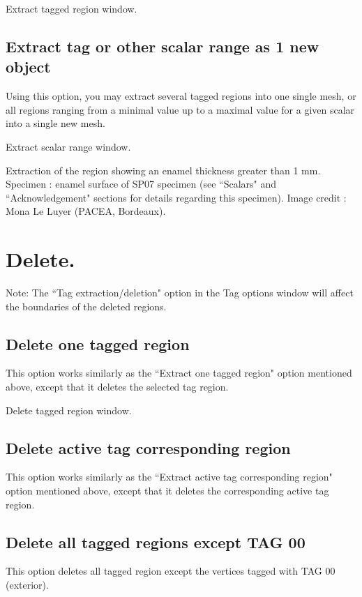 Extract tagged region window.

\subsection{Extract tag or other scalar range as 1 new object}
Using this option, you may extract several tagged regions
into one single mesh, or all regions ranging from a minimal
value up to a maximal value for a given scalar into a single
new mesh.

Extract scalar range window.

Extraction of the region showing an enamel thickness greater than 1 mm. Specimen : enamel surface of SP07 specimen (see ``Scalars" and ``Acknowledgement" sections for details regarding this specimen). Image credit : Mona Le Luyer (PACEA, Bordeaux).



\section{Delete.}
Note: The ``Tag extraction/deletion" option in the Tag options window will affect the boundaries of the deleted regions.

\subsection{Delete one tagged region}
This option works similarly as the ``Extract one tagged
region" option mentioned above, except that it deletes the
selected tag region.

Delete tagged region window.

\subsection{Delete active tag corresponding region}
This option works similarly as the ``Extract active tag corresponding region" option mentioned above, except that it deletes the corresponding active tag region.

\subsection{Delete all tagged regions except TAG 00}
This option deletes all tagged region except the vertices tagged with TAG 00 (exterior).